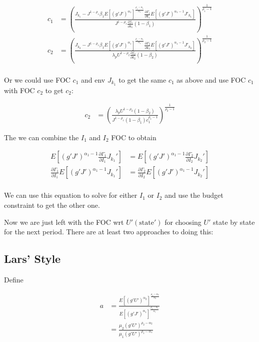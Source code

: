 \documentclass[10pt]{article}
\newcommand{\fracpd}[2]{
  \ensuremath{\frac{\partial #1}{\partial #2}}
}
\begin{document}
\begin{align} \label{eq:solve_c}
  c_1 &= \left( \frac{J_{k_1} - J^{1-\rho_1} \beta_1 E\left[(g'J')^{\alpha_1} \right]^{\frac{\rho_1 - \alpha_1}{\alpha_1}} \fracpd{\Gamma_1}{k_1} E \left[ (g'J')^{\alpha_1 - 1} J'_{k_1} \right]}{J^{1-\rho_1} \fracpd{f_1}{k_1} (1 - \beta_1)} \right)^{\frac{1}{\rho_1 - 1}} \\
   c_2 &= \left( \frac{J_{k_2} - J^{1-\rho_1} \beta_1 E\left[(g'J')^{\alpha_1} \right]^{\frac{\rho_1 - \alpha_1}{\alpha_1}} \fracpd{\Gamma_2}{k_2} E \left[ (g'J')^{\alpha_1 - 1} J'_{k_2} \right]}{\lambda_p  U^{1-\rho_2} \fracpd{f_2}{k_2} (1 - \beta_2)} \right)^{\frac{1}{\rho_2 - 1}} \\
\end{align}


Or we could use FOC $c_1$ and env $J_{k_1}$ to get the same $c_1$ as above and
use FOC $c_1$ with FOC $c_2$ to get $c_2$:

\begin{align*}
  c_2 &= \left( \frac{\lambda_p U^{1-\rho_2}(1 - \beta_2)}{J^{1-\rho_1} (1 - \beta_1)c_1^{\rho_1 - 1}} \right)^{\frac{1}{\rho_2-1}}
\end{align*}

The we can combine the $I_1$ and $I_2$ FOC to obtain

\begin{align} \label{eq:solve_I}
  E \left[ (g'J')^{\alpha_1 - 1} \fracpd{\Gamma_1}{I_1} J_{k_1}' \right] &= E \left[ (g'J')^{\alpha_1 - 1} \fracpd{\Gamma_2}{I_2} J_{k_2}' \right] \\
  \fracpd{\Gamma_1}{I_1} E \left[ (g'J')^{\alpha_1 - 1} J_{k_1}' \right] &= \fracpd{\Gamma_2}{I_2} E \left[ (g'J')^{\alpha_1 - 1} J_{k_2}' \right] \\
\end{align}

We can use this equation to solve for either $I_1$ or $I_2$ and use the budget constraint to get the other one.

Now we are just left with the FOC wrt $U'(\text{state}')$ for choosing $U'$ state by state for the next period. There are at least two approaches to doing this:

  \subsection{Lars' Style} \label{sub:Lars_Style}

    Define

    \begin{align*}
      a &= \frac{E \left[ (g'U')^{\alpha_2} \right]^{\frac{\rho_2 - \alpha_2}{\alpha_2}}}{E \left[ (g'J')^{\alpha_1} \right]^{\frac{\rho_1 - \alpha_1}{\alpha_1}}} \\
      &= \frac{\mu_2(g' U')^{\rho_2 - \alpha_2}}{\mu_1(g' U')^{\rho_1 - \alpha_1}} \\
    \end{align*}
\end{document}
